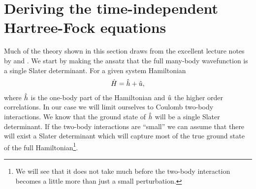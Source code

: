     \section{Deriving the time-independent Hartree-Fock equations}
        Much of the theory shown in this section draws from the excellent
        lecture notes by \citeauthor{kvaal2017notes} and
        \citeauthor{szabo1996modern}.  We start by making the ansatz that the
        full many-body wavefunction is a single Slater determinant. For a given
        system Hamiltonian
        \begin{align}
            \hat{H} = \hat{h} + \hat{u},
        \end{align}
        where $\hat{h}$ is the one-body part of the Hamiltonian and
        $\hat{u}$ the higher order correlations. In our case we will limit
        ourselves to Coulomb two-body interactions. We know that the ground
        state of $\hat{h}$ will be a single Slater determinant. If the
        two-body interactions are ``small'' we can assume that there will exist
        a Slater determinant which will capture most of the true ground state of
        the full Hamiltonian\footnote{We will see that it does not take much
        before the two-body interaction becomes a little more than just a small
        perturbation.}.

